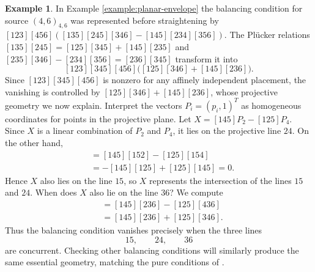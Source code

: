 \documentclass[11pt,letterpaper]{amsart}
\theoremstyle{definition}
\newtheorem{example}{Example}
\begin{document}
\begin{example}\label{example:three-concurrent-lines}
In Example \ref{example:planar-envelope} the balancing condition for source $(4,6)_{4,6}$ was represented before straightening by $[123][456]([135][245][346] - [145][234][356])$. The Pl\"ucker relations $[135][245]=[125][345]+[145][235]$ and $[235][346]-[234][356]=[236][345]$ transform it into
\begin{equation*}
    [123][345][456] \bigg([125][346]+[145][236]\bigg).
\end{equation*}
Since $[123][345][456]$ is nonzero for any affinely independent placement, the vanishing is controlled by $[125][346]+[145][236]$, whose projective geometry we now explain. Interpret the vectors $P_i=(p_i,1)^T$ as homogeneous coordinates for points in the projective plane.  Let $X=[145]P_2-[125]P_4$. Since $X$ is a linear combination of $P_2$ and $P_4$, it lies on the projective line $24$.  On the other hand,
\begin{align*}
    [15X]
    &= [145][152]-[125][154]\\
    &= -[145][125]+[125][145] = 0.
\end{align*}
Hence $X$ also lies on the line $15$, so $X$ represents the intersection of the lines $15$ and $24$. When does $X$ also lie on the line $36$?  We compute
\begin{align*}
    [X36]
    &= [145][236]-[125][436]\\
    &= [145][236]+[125][346].
\end{align*}
Thus the balancing
condition vanishes precisely when the three lines
\begin{equation*}
    15,\qquad 24,\qquad 36
\end{equation*}
are concurrent. Checking other balancing conditions will similarly produce the same essential geometry, matching the pure conditions of \cite{white-whiteley}.
\end{example}
\end{document}
